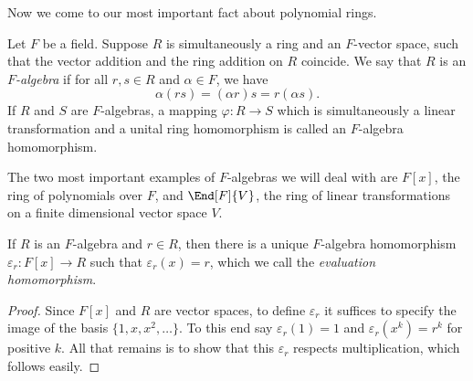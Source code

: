 \documentclass{memoir}
\begin{document}
Now we come to our most important fact about polynomial rings.

\begin{dfn}
Let $F$ be a field. Suppose $R$ is simultaneously a ring and an $F$-vector space, such that the vector addition and the ring addition on $R$ coincide. We say that $R$ is an \emph{$F$-algebra} if for all $r,s \in R$ and $\alpha \in F$, we have \[ \alpha(rs) = (\alpha r)s = r(\alpha s). \] If $R$ and $S$ are $F$-algebras, a mapping $\varphi : R \rightarrow S$ which is simultaneously a linear transformation and a unital ring homomorphism is called an $F$-algebra homomorphism.
\end{dfn}

The two most important examples of $F$-algebras we will deal with are $F[x]$, the ring of polynomials over $F$, and $\End[F]{V}$, the ring of linear transformations on a finite dimensional vector space $V$.

\begin{prp}
If $R$ is an $F$-algebra and $r \in R$, then there is a unique $F$-algebra homomorphism $\varepsilon_r : F[x] \rightarrow R$ such that $\varepsilon_r(x) = r$, which we call the \emph{evaluation homomorphism}.
\end{prp}

\begin{proof}
Since $F[x]$ and $R$ are vector spaces, to define $\varepsilon_r$ it suffices to specify the image of the basis $\{1, x, x^2, \ldots\}$. To this end say $\varepsilon_r(1) = 1$ and $\varepsilon_r(x^k) = r^k$ for positive $k$. All that remains is to show that this $\varepsilon_r$ respects multiplication, which follows easily.
\end{proof}
\end{document}
